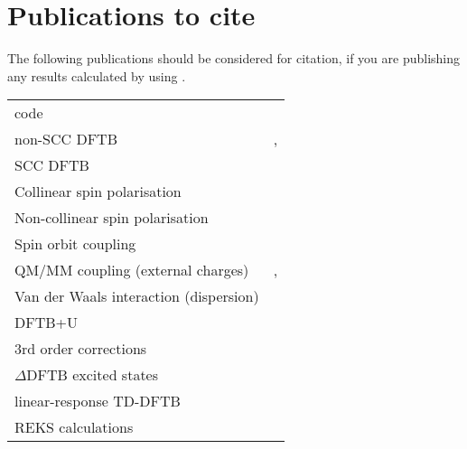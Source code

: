 \chapter{Publications to cite}

The following publications should be considered for citation, if you
are publishing any results calculated by using \dftbp.


\begin{tabular}{lr}
\dftbp{} code & \cite{dftbp-2020paper} \\
non-SCC DFTB & \cite{porezag-PRB-51-12947}, \cite{seifert-ijqc-58-185}
\\
SCC DFTB & \cite{elstner-prb-58-7260} \\
Collinear spin polarisation & \cite{koehler-cp-309-23} \\
Non-collinear spin polarisation & \cite{koehler-JPCA-111-5622} \\
Spin orbit coupling & \cite{koehler-JPCA-111-5622} \\
QM/MM coupling (external charges) & \cite{cui-jpcb-105-569},
\cite{han-ijqc-78-459} \\
Van der Waals interaction (dispersion) & \cite{elstner-jcp-114-5149} \\
DFTB+U & \cite{hourahine07}\\
3rd order corrections & \cite{yang-JPCA-111-10861} \\
$\Delta$DFTB excited states & \cite{irle-JCTC-12-313} \\
linear-response TD-DFTB  & \cite{niehaus-prb-63-085108}\\
REKS calculations & \cite{Lee_JCTC_2019} \\
\end{tabular}


